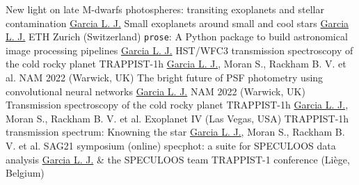 
{New light on late M-dwarfs photospheres: transiting exoplanets and stellar contamination}
{\underline{Garcia L. J.}}
{}
{Small exoplanets around small and cool stars}
{\underline{Garcia L. J.}}
{ETH Zurich (Switzerland)}
{\texttt{prose}: A Python package to build astronomical image processing pipelines}
{\underline{Garcia L. J.}}
{}
{HST/WFC3 transmission spectroscopy of the cold rocky planet TRAPPIST-1h}
{\underline{Garcia L. J.}, Moran S., Rackham B. V. et al.}
{NAM 2022 (Warwick, UK)}
{The bright future of PSF photometry using convolutional neural networks}
{\underline{Garcia L. J.}}
{NAM 2022 (Warwick, UK)}
{Transmission spectroscopy of the cold rocky planet TRAPPIST-1h}
{\underline{Garcia L. J.}, Moran S., Rackham B. V. et al.}
{Exoplanet IV (Las Vegas, USA)}
{TRAPPIST-1h transmission spectrum: Knowning the star}
{\underline{Garcia L. J.}, Moran S., Rackham B. V. et al.}
{SAG21 symposium (online)}
{specphot: a suite for SPECULOOS data analysis}
{\underline{Garcia L. J.} \& the SPECULOOS team}
{TRAPPIST-1 conference (Liège, Belgium)}
